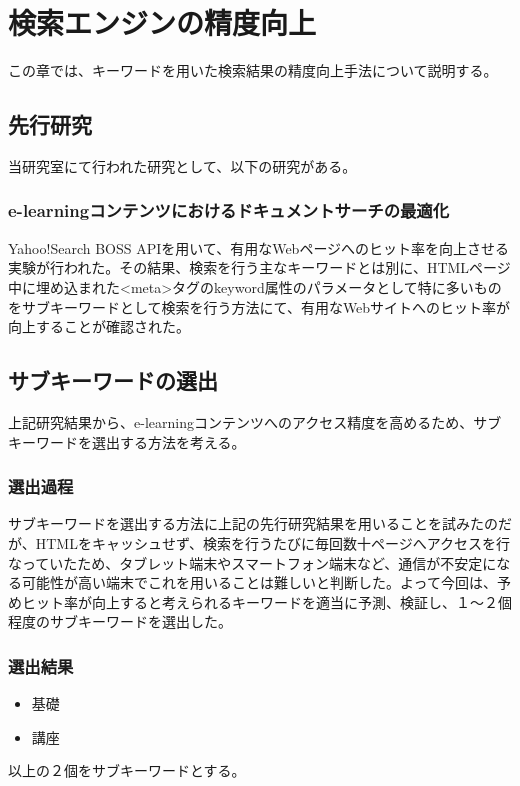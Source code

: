 \chapter{検索エンジンの精度向上}
\label{chap:search}

この章では、キーワードを用いた検索結果の精度向上手法について説明する。

\section{先行研究}
当研究室にて行われた研究として、以下の研究がある。

\subsection{e-learningコンテンツにおけるドキュメントサーチの最適化}
Yahoo!Search BOSS APIを用いて、有用なWebページへのヒット率を向上させる実験が行われた。その結果、検索を行う主なキーワードとは別に、HTMLページ中に埋め込まれた<meta>タグのkeyword属性のパラメータとして特に多いものをサブキーワードとして検索を行う方法にて、有用なWebサイトへのヒット率が向上することが確認された。

\section{サブキーワードの選出}
上記研究結果から、e-learningコンテンツへのアクセス精度を高めるため、サブキーワードを選出する方法を考える。

\subsection{選出過程}
サブキーワードを選出する方法に上記の先行研究結果を用いることを試みたのだが、HTMLをキャッシュせず、検索を行うたびに毎回数十ページへアクセスを行なっていたため、タブレット端末やスマートフォン端末など、通信が不安定になる可能性が高い端末でこれを用いることは難しいと判断した。よって今回は、予めヒット率が向上すると考えられるキーワードを適当に予測、検証し、１〜２個程度のサブキーワードを選出した。

\subsection{選出結果}
\begin{itemize}
\item 基礎
\item 講座
\end{itemize}
以上の２個をサブキーワードとする。
